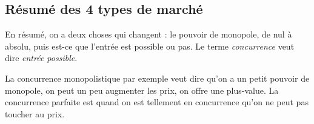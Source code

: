 \subsection{Résumé des 4 types de marché}
En résumé, on a deux choses qui changent : le pouvoir de monopole, de nul à absolu, puis est-ce que l'entrée est possible ou pas. Le terme \textit{concurrence} veut dire \textit{entrée possible}.

La concurrence monopolistique par exemple veut dire qu'on a un petit pouvoir de monopole, on peut un peu augmenter
les prix, on offre une plus-value. La concurrence parfaite est quand on est tellement en concurrence qu'on ne peut pas toucher au prix.